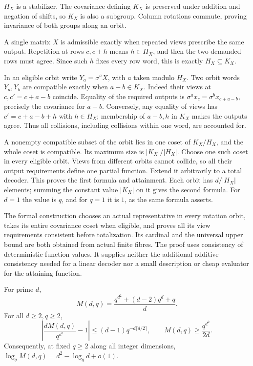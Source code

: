 \begin{outline}
$H_X$ is a stabilizer. The covariance defining $K_X$ is preserved under
addition and negation of shifts, so $K_X$ is also a subgroup. Column
rotations commute, proving invariance of both groups along an orbit.

A single matrix $X$ is admissible exactly when repeated views prescribe
the same output. Repetition at rows $c,c+h$ means $h\in H_X$, and then
the two demanded rows must agree. Since such $h$ fixes every row word,
this is exactly $H_X\subseteq K_X$.

In an eligible orbit write $Y_a=\sigma^aX$, with $a$ taken modulo $H_X$.
Two orbit words $Y_a,Y_b$ are compatible exactly when $a-b\in K_X$.
Indeed their views at $c,c'=c+a-b$ coincide. Equality of the required
outputs is
$\sigma^a x_c=\sigma^b x_{c+a-b}$, precisely the covariance for $a-b$.
Conversely, any equality of views has $c'=c+a-b+h$ with $h\in H_X$;
membership of $a-b,h$ in $K_X$ makes the outputs agree. Thus all collisions,
including collisions within one word, are accounted for.

A nonempty compatible subset of the orbit lies in one coset of $K_X/H_X$,
and the whole coset is compatible. Its maximum size is $|K_X|/|H_X|$.
Choose one such coset in every eligible orbit. Views from different orbits
cannot collide, so all their output requirements define one partial
function. Extend it arbitrarily to a total decoder. This proves the first
formula and attainment. Each orbit has $d/|H_X|$ elements; summing the
constant value $|K_X|$ on it gives the second formula. For $d=1$ the value
is $q$, and for $q=1$ it is $1$, as the same formula asserts.
\end{outline}

The formal construction chooses an actual representative in every rotation orbit,
takes its entire covariance coset when eligible, and proves all its view
requirements consistent before totalization. Its cardinal and the universal
upper bound are both obtained from actual finite fibres.
The proof uses consistency of deterministic function values. It supplies
neither the additional additive consistency needed for a linear decoder
nor a small description or cheap evaluator for the attaining function.

\begin{corollary}\label{cor:set-capacity-rate}
For prime $d$,
\[
 M(d,q)=\frac{q^{d^2}+(d-2)q^d+q}{d}.
\]
For all $d\ge2,q\ge2$,
\[
 \left|\frac{dM(d,q)}{q^{d^2}}-1\right|
 \le(d-1)q^{-d\lceil d/2\rceil},\qquad
 M(d,q)\ge\frac{q^{d^2}}{2d}.
\]
Consequently, at fixed $q\ge2$ along all integer dimensions,
$\log_q M(d,q)=d^2-\log_q d+o(1)$.
\end{corollary}

